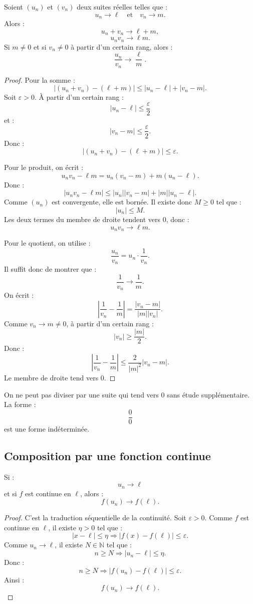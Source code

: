 \documentclass[11pt,a4paper]{article}
\newcommand{\N}{\mathbb N}
\newcommand{\abs}[1]{\left|#1\right|}
\newcommand{\implique}{\Longrightarrow}
\begin{document}
\begin{theorembox}
Soient \((u_n)\) et \((v_n)\) deux suites réelles telles que :
\[
u_n\to \ell
\quad\text{et}\quad
v_n\to m.
\]
Alors :
\[
u_n+v_n\to \ell+m,
\]
\[
u_nv_n\to \ell m.
\]
Si \(m\neq0\) et si \(v_n\neq0\) à partir d'un certain rang, alors :
\[
\frac{u_n}{v_n}\to \frac{\ell}{m}.
\]
\end{theorembox}

\begin{proof}
Pour la somme :
\[
\abs{(u_n+v_n)-(\ell+m)}
\leq
\abs{u_n-\ell}+\abs{v_n-m}.
\]
Soit \(\varepsilon>0\).  
À partir d'un certain rang :
\[
\abs{u_n-\ell}\leq\frac{\varepsilon}{2}
\]
et :
\[
\abs{v_n-m}\leq\frac{\varepsilon}{2}.
\]
Donc :
\[
\abs{(u_n+v_n)-(\ell+m)}\leq\varepsilon.
\]

Pour le produit, on écrit :
\[
u_nv_n-\ell m
=
u_n(v_n-m)+m(u_n-\ell).
\]
Donc :
\[
\abs{u_nv_n-\ell m}
\leq
\abs{u_n}\abs{v_n-m}+\abs{m}\abs{u_n-\ell}.
\]
Comme \((u_n)\) est convergente, elle est bornée.  
Il existe donc \(M\geq0\) tel que :
\[
\abs{u_n}\leq M.
\]
Les deux termes du membre de droite tendent vers \(0\), donc :
\[
u_nv_n\to\ell m.
\]

Pour le quotient, on utilise :
\[
\frac{u_n}{v_n}=u_n\cdot\frac1{v_n}.
\]
Il suffit donc de montrer que :
\[
\frac1{v_n}\to\frac1m.
\]
On écrit :
\[
\left|\frac1{v_n}-\frac1m\right|
=
\frac{\abs{v_n-m}}{\abs{m}\abs{v_n}}.
\]
Comme \(v_n\to m\neq0\), à partir d'un certain rang :
\[
\abs{v_n}\geq\frac{\abs{m}}{2}.
\]
Donc :
\[
\left|\frac1{v_n}-\frac1m\right|
\leq
\frac{2}{\abs{m}^2}\abs{v_n-m}.
\]
Le membre de droite tend vers \(0\).
\end{proof}

\begin{erreurbox}
On ne peut pas diviser par une suite qui tend vers \(0\) sans étude supplémentaire.  
La forme :
\[
\frac{0}{0}
\]
est une forme indéterminée.
\end{erreurbox}

\subsection{Composition par une fonction continue}

\begin{theorembox}
Si :
\[
u_n\to\ell
\]
et si \(f\) est continue en \(\ell\), alors :
\[
f(u_n)\to f(\ell).
\]
\end{theorembox}

\begin{proof}
C'est la traduction séquentielle de la continuité.  
Soit \(\varepsilon>0\).  
Comme \(f\) est continue en \(\ell\), il existe \(\eta>0\) tel que :
\[
\abs{x-\ell}\leq\eta \implique \abs{f(x)-f(\ell)}\leq\varepsilon.
\]
Comme \(u_n\to\ell\), il existe \(N\in\N\) tel que :
\[
n\geq N \implique \abs{u_n-\ell}\leq\eta.
\]
Donc :
\[
n\geq N \implique \abs{f(u_n)-f(\ell)}\leq\varepsilon.
\]
Ainsi :
\[
f(u_n)\to f(\ell).
\]
\end{proof}
\end{document}
